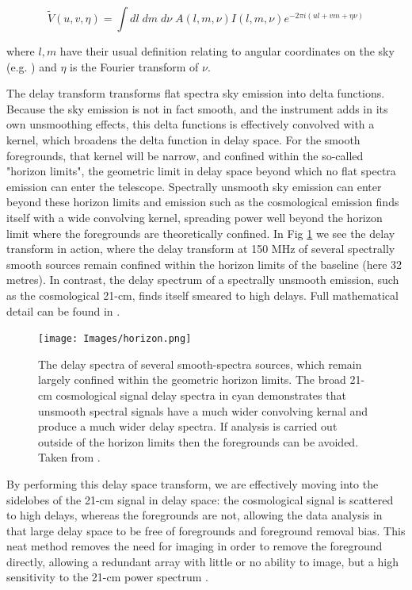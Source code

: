 \begin{equation}
    \widetilde{V}(u,v,\eta) = \int dl \; dm \; d\nu \; A(l,m,\nu)I(l,m,\nu)e^{-2\pi i(ul+vm+\eta\nu)}
\end{equation}

\noindent where $l,m$ have their usual definition relating to angular coordinates on the sky (e.g. \citet{Thompson2001isra.book.....T}) and $\eta$ is the Fourier transform of $\nu$.

The delay transform transforms flat spectra sky emission into delta functions. Because the sky emission is not in fact smooth, and the instrument adds in its own unsmoothing effects, this delta functions is effectively convolved with a kernel, which broadens the delta function in delay space. For the smooth foregrounds, that kernel will be narrow, and confined within the so-called "horizon limits", the geometric limit in delay space beyond which no flat spectra emission can enter the telescope. Spectrally unsmooth sky emission can enter beyond these horizon limits and emission such as the cosmological emission finds itself with a wide convolving kernel, spreading power well beyond the horizon limit where the foregrounds are theoretically confined. In Fig \ref{fig:horizon} we see the delay transform in action, where the delay transform at 150 MHz of several spectrally smooth sources remain confined within the horizon limits of the baseline (here 32 metres). In contrast, the delay spectrum of a spectrally unsmooth emission, such as the cosmological 21-cm, finds itself smeared to high delays. Full mathematical detail can be found in \citet{Parsons2012ApJ...756..165P,Parsons2012ApJ...753...81P,Parsons2009AJ....138..219P}.

\begin{figure}
\begin{center}
    \texttt{[image: Images/horizon.png]}
\end{center}
    \caption{The delay spectra of several smooth-spectra sources, which remain largely confined within the geometric horizon limits. The broad 21-cm cosmological signal delay spectra in cyan demonstrates that unsmooth spectral signals have a much wider convolving kernal and produce a much wider delay spectra. If analysis is carried out outside of the horizon limits then the foregrounds can be avoided. Taken from \citet{Parsons2012ApJ...756..165P}.}
    \label{fig:horizon}
\end{figure}

By performing this delay space transform, we are effectively moving into the sidelobes of the 21-cm signal in delay space: the cosmological signal is scattered to high delays, whereas the foregrounds are not, allowing the data analysis in that large delay space to be free of foregrounds and foreground removal bias. This neat method removes the need for imaging in order to remove the foreground directly, allowing a redundant array with little or no ability to image, but a high sensitivity to the 21-cm power spectrum \citep{Parsons2012ApJ...753...81P}.   

